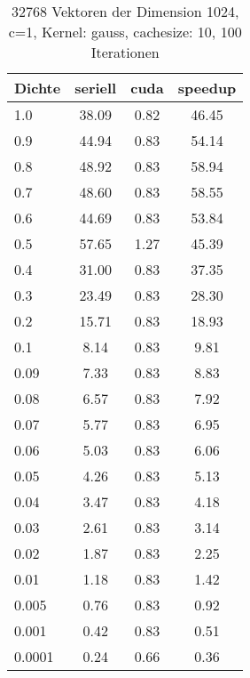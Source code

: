 \documentclass[ngerman]{scrartcl}
\begin{document}
\begin{table}
\begin{center}
\begin{tabular}{|l|c|c|c|}
\hline
Dichte & seriell & cuda & speedup \\
\hline
1.0 & 38.09 & 0.82 & 46.45 \\
0.9 & 44.94 & 0.83 & 54.14 \\
0.8 & 48.92 & 0.83 & 58.94 \\
0.7 & 48.60 & 0.83 & 58.55 \\
0.6 & 44.69 & 0.83 & 53.84 \\
0.5 & 57.65 & 1.27 & 45.39 \\
0.4 & 31.00 & 0.83 & 37.35 \\
0.3 & 23.49 & 0.83 & 28.30 \\
0.2 & 15.71 & 0.83 & 18.93 \\
0.1 & 8.14 & 0.83 & 9.81 \\
0.09 & 7.33 & 0.83 & 8.83 \\
0.08 & 6.57 & 0.83 & 7.92 \\
0.07 & 5.77 & 0.83 & 6.95 \\
0.06 & 5.03 & 0.83 & 6.06 \\
0.05 & 4.26 & 0.83 & 5.13 \\
0.04 & 3.47 & 0.83 & 4.18 \\
0.03 & 2.61 & 0.83 & 3.14 \\
0.02 & 1.87 & 0.83 & 2.25 \\
0.01 & 1.18 & 0.83 & 1.42 \\
0.005 & 0.76 & 0.83 & 0.92 \\
0.001 & 0.42 & 0.83 & 0.51 \\
0.0001 & 0.24 & 0.66 & 0.36 \\
\hline
\end{tabular}
\end{center}
\caption{ 32768 Vektoren der Dimension 1024, c=1, Kernel: gauss, cachesize: 10, 100 Iterationen}
\label{tbl:density-gauss-10}
\end{table}
\end{document}
